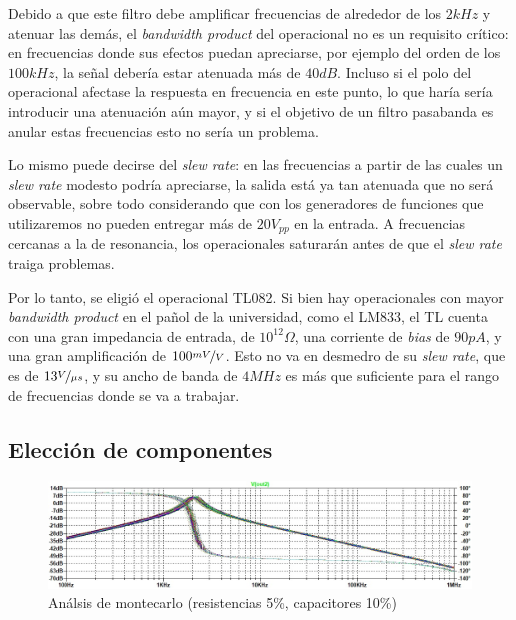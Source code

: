 \documentclass[../../tc_tp3_main.tex]{subfiles}
\begin{document}
Debido a que este filtro debe amplificar frecuencias de alrededor de los $2kHz$ y atenuar las dem\'as, el \textit{bandwidth product} del operacional no es un requisito cr\'itico: en frecuencias donde sus efectos puedan apreciarse, por ejemplo del orden de los $100kHz$, la se\~nal deber\'ia estar atenuada m\'as de $40dB$. Incluso si el polo del operacional afectase la respuesta en frecuencia en este punto, lo que har\'ia ser\'ia introducir una atenuaci\'on a\'un mayor, y si el objetivo de un filtro pasabanda es anular estas frecuencias esto no ser\'ia un problema. \par 

Lo mismo puede decirse del \textit{slew rate}: en las frecuencias a partir de las cuales un \textit{slew rate} modesto podr\'ia apreciarse, la salida est\'a ya tan atenuada que no ser\'a observable, sobre todo considerando que con los generadores de funciones que utilizaremos no pueden entregar m\'as de $20V_{pp}$ en la entrada. A frecuencias cercanas a la de resonancia, los operacionales saturar\'an antes de que el \textit{slew rate} traiga problemas.\par

Por lo tanto, se eligi\'o el operacional TL082. Si bien hay operacionales con mayor \textit{bandwidth product} en el pa\~nol de la universidad, como el LM833, el TL cuenta con una gran impedancia de entrada, de $10^{12}\Omega$, una corriente de \textit{bias} de $90pA$, y una gran amplificaci\'on de $100\nicefrac{mV}{V}$. Esto no va en desmedro de su \textit{slew rate}, que es de $13\nicefrac{V}{\mu s}$, y su ancho de banda de $4MHz$ es m\'as que suficiente para el rango de frecuencias donde se va a trabajar.


\subsection{Elecci\'on de componentes}

\begin{figure}[b]
	\centering
  \includegraphics[scale = 0.7]{imagenes/ej1-montecarlo.jpg}
  \caption{An\'alsis de montecarlo (resistencias 5\%, capacitores 10\%)}
  \label{fig:1-montecarlo}
\end{figure}
\end{document}
